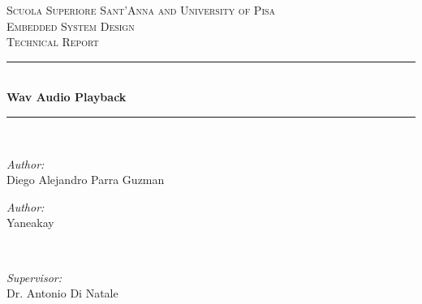 \begin{titlepage}

\newcommand{\HRule}{\rule{\linewidth}{0.5mm}} %

\center %
 

\textsc{\LARGE Scuola Superiore Sant'Anna and University of Pisa}\\[1.0cm] %
\textsc{\Large Embedded System Design}\\[0.5cm] %
\textsc{\large Technical Report}\\[0.5cm] %


\HRule \\[0.4cm]
{ \huge \bfseries Wav Audio Playback}\\[0.4cm] %
\HRule \\[1.5cm]
 

\begin{minipage}{0.5\textwidth}
\begin{flushleft} \large
\emph{Author:}\\
Diego Alejandro Parra Guzman %

\emph{Author:}\\
Yaneakay  %
\end{flushleft}
\end{minipage}
~
\begin{minipage}{0.4\textwidth}
\begin{flushright} \large
\emph{Supervisor:} \\
Dr. Antonio Di Natale %
\end{flushright}
\end{minipage}\\[2cm]


\end{titlepage}
